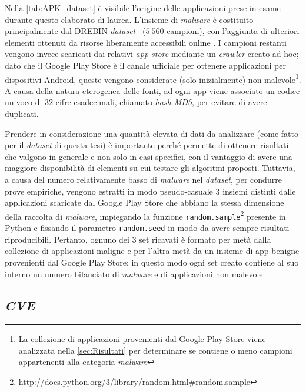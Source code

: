 \documentclass[12pt,a4paper,oneside]{article}
\begin{document}
\noindent Nella \cref{tab:APK_dataset} è visibile l'origine delle applicazioni prese in esame durante questo elaborato di laurea. L'insieme di \textit{malware} è costituito principalmente dal DREBIN \textit{dataset}~\cite{DREBIN_DATASET} ($5~560$ campioni), con l'aggiunta di ulteriori elementi ottenuti da risorse liberamente accessibili online \cite{CONTAGIO_DATASET, HUSTED_DATASET, BHATIA_DATASET}. I campioni restanti vengono invece scaricati dai relativi \textit{app store} mediante un \textit{crawler} creato ad hoc; dato che il Google Play Store è il canale ufficiale per ottenere applicazioni per dispositivi Android, queste vengono considerate (solo inizialmente) non malevole\footnote{La collezione di applicazioni provenienti dal Google Play Store viene analizzata nella \cref{sec:Risultati} per determinare se contiene o meno campioni appartenenti alla categoria \textit{malware}\vspace{1ex}}. A causa della natura eterogenea delle fonti, ad ogni app viene associato un codice univoco di $32$ cifre esadecimali, chiamato \textit{hash MD5}, per evitare di avere duplicati.

Prendere in considerazione una quantità elevata di dati da analizzare (come fatto per il \textit{dataset} di questa tesi) è importante perché permette di ottenere risultati che valgono in generale e non solo in casi specifici, con il vantaggio di avere una maggiore disponibilità di elementi su cui testare gli algoritmi proposti. Tuttavia, a causa del numero relativamente basso di \textit{malware} nel \textit{dataset}, per condurre prove empiriche, vengono estratti in modo pseudo-casuale $3$ insiemi distinti dalle applicazioni scaricate dal Google Play Store che abbiano la stessa dimensione della raccolta di \textit{malware}, impiegando la funzione \texttt{random.sample}\footnote{\url{http://docs.python.org/3/library/random.html\#random.sample}} presente in Python e fissando il parametro \texttt{random.seed} in modo da avere sempre risultati riproducibili. Pertanto, ognuno dei $3$ set ricavati è formato per metà dalla collezione di applicazioni maligne e per l'altra metà da un insieme di app benigne provenienti dal Google Play Store; in questo modo ogni set creato contiene al suo interno un numero bilanciato di \textit{malware} e di applicazioni non malevole.



\subsection{\textit{\acrlong{CVE}}}\label{sec:cve}
\end{document}
